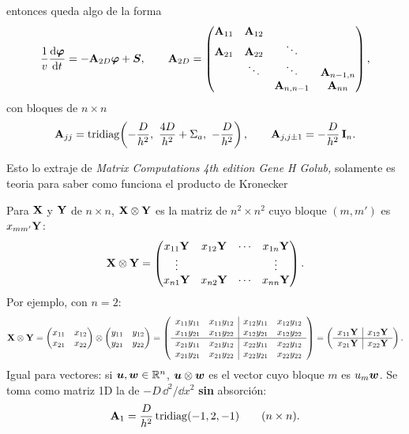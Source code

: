 entonces queda algo de la forma
\[
\frac1v\frac{\mathrm{d}\bm{\varphi}}{\mathrm{d} t} = -\mathbf{A}_{2D}\bm{\varphi} + \bm{S},
\qquad
\mathbf{A}_{2D} =
\begin{pmatrix}
	\mathbf{A}_{11} & \mathbf{A}_{12} &              &              \\
	\mathbf{A}_{21} & \mathbf{A}_{22} & \ddots       &              \\
	& \ddots       & \ddots       & \mathbf{A}_{n-1,n}\\
	&              & \mathbf{A}_{n,n-1} & \mathbf{A}_{nn}
\end{pmatrix},
\]
con bloques de $n\times n$
\[
\mat{A}_{jj} = \tridiag\!\left(-\frac{D}{h^2},\ \frac{4D}{h^2} + \Sigma_a,\ -\frac{D}{h^2}\right),
\qquad
\mat{A}_{j,j\pm1} = -\frac{D}{h^2}\,\mat{I}_n .
\]



Esto lo extraje de \textit{Matrix Computations 4th edition Gene H Golub,} solamente es teoria para saber como funciona el producto de Kronecker

Para $\mathbf{X}$ y $\mathbf{Y}$ de $n\times n$, $\mathbf{X}\otimes\mathbf{Y}$ es la matriz de $n^2\times n^2$ cuyo
bloque $(m, m')$ es $x_{mm'}\mathbf{Y}$:
\[
\mathbf{X}\otimes\mathbf{Y} =
\begin{pmatrix}
	x_{11}\mathbf{Y} & x_{12}\mathbf{Y} & \cdots & x_{1n}\mathbf{Y}\\
	\vdots        &               &        & \vdots       \\
	x_{n1}\mathbf{Y} & x_{n2}\mathbf{Y} & \cdots & x_{nn}\mathbf{Y}
\end{pmatrix}.
\]
Por ejemplo, con $n = 2$:
\[
\mathbf{X}\otimes\mathbf{Y} =
\begin{pmatrix} x_{11} & x_{12}\\ x_{21} & x_{22} \end{pmatrix}\otimes
\begin{pmatrix} y_{11} & y_{12}\\ y_{21} & y_{22} \end{pmatrix}
=
\left(\begin{array}{cc|cc}
	x_{11}y_{11} & x_{11}y_{12} & x_{12}y_{11} & x_{12}y_{12}\\
	x_{11}y_{21} & x_{11}y_{22} & x_{12}y_{21} & x_{12}y_{22}\\ \hline
	x_{21}y_{11} & x_{21}y_{12} & x_{22}y_{11} & x_{22}y_{12}\\
	x_{21}y_{21} & x_{21}y_{22} & x_{22}y_{21} & x_{22}y_{22}
\end{array}\right)
=
\left(\begin{array}{c|c}
	x_{11}\mathbf{Y} & x_{12}\mathbf{Y}\\ \hline
	x_{21}\mathbf{Y} & x_{22}\mathbf{Y}
\end{array}\right).
\]
Igual para vectores: si $\bm{u}, \bm{w}\in\mathbb{R}^n$, $\bm{u}\otimes\bm{w}$ es el vector cuyo bloque
$m$ es $u_m\bm{w}$. Se toma como matriz 1D la de $-D\,\dd^2/\dd x^2$ \textbf{sin} absorción:
\[
\mathbf{A}_1 = \frac{D}{h^2}\operatorname{tridiag}(-1, 2, -1)\qquad (n\times n).
\]

